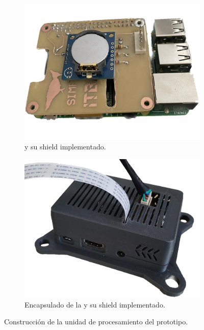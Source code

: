 \begin{figure}[H]
\centering
    	\begin{subfigure}{0.49\textwidth}
        	\centering
        	\includegraphics[width=\linewidth]{ImagenesConstruccion del prototipo/rpiyshield_prototipo}		
			\caption{\rspi y su shield implementado.}
			\label{fig:rpiyshield_prototipo}
        \end{subfigure}\hfill
        \begin{subfigure}{0.49\textwidth}
        	\centering
        	\includegraphics[width=\linewidth]{ImagenesConstruccion del prototipo/rpiyshield_encapsulado_prototipo}
        	\caption{Encapsulado de la \rspi y su shield implementado.}
			\label{fig:casing_rpi}
        \end{subfigure}
	\caption{Construcción de la unidad de procesamiento del prototipo.}
	\label{fig:up_prototipo}
\end{figure}

